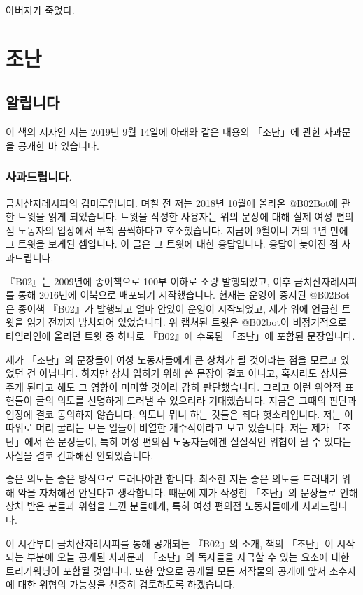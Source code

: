 \documentclass[a5paper,10pt, twoside, openright]{memoir}
\begin{document}
	아버지가 죽었다.



			\chapter{조난} 
				\section{알립니다} 
				이 책의 저자인 저는 2019년 9월 14일에 아래와 같은 내용의 「조난」에 관한 사과문을 공개한 바 있습니다.

				\subsection{사과드립니다.}
				금치산자레시피의 김미루입니다. 며칠 전 저는 2018년 10월에 올라온 @B02Bot에 관한 트윗을 읽게 되었습니다. 트윗을 작성한 사용자는 위의 문장에 대해 실제 여성 편의점 노동자의 입장에서 무척 끔찍하다고 호소했습니다. 지금이 9월이니 거의 1년 만에 그 트윗을 보게된 셈입니다. 이 글은 그 트윗에 대한 응답입니다. 응답이 늦어진 점 사과드립니다.

『B02』는 2009년에 종이책으로 100부 이하로 소량 발행되었고, 이후 금치산자레시피를 통해 2016년에 이북으로 배포되기 시작했습니다. 현재는 운영이 중지된 @B02Bot은 종이책 『B02』가 발행되고 얼마 안있어 운영이 시작되었고, 제가 위에 언급한 트윗을 읽기 전까지 방치되어 있었습니다. 위 캡쳐된 트윗은 @B02bot이 비정기적으로 타임라인에 올리던 트윗 중 하나로 『B02』에 수록된 「조난」에 포함된 문장입니다. 

제가 「조난」의 문장들이 여성 노동자들에게 큰 상처가 될 것이라는 점을 모르고 있었던 건 아닙니다. 하지만 상처 입히기 위해 쓴 문장이 결코 아니고, 혹시라도 상처를 주게 된다고 해도 그 영향이 미미할 것이라 감히 판단했습니다. 그리고 이런 위악적 표현들이 글의 의도를 선명하게 드러낼 수 있으리라 기대했습니다. 지금은 그때의 판단과 입장에 결코 동의하지 않습니다. 의도니 뭐니 하는 것들은 죄다 헛소리입니다. 저는 이따위로 머리 굴리는 모든 일들이 비열한 개수작이라고 보고 있습니다. 저는 제가 「조난」에서 쓴 문장들이, 특히 여성 편의점 노동자들에겐 실질적인 위협이 될 수 있다는 사실을 결코 간과해선 안되었습니다.

좋은 의도는 좋은 방식으로 드러나야만 합니다. 최소한 저는 좋은 의도를 드러내기 위해 악을 자처해선 안된다고 생각합니다. 때문에 제가 작성한 「조난」의 문장들로 인해 상처 받은 분들과 위협을 느낀 분들에게, 특히 여성 편의점 노동자들에게 사과드립니다.

이 시간부터 금치산자레시피를 통해 공개되는 『B02』의 소개, 책의 「조난」이 시작되는 부분에 오늘 공개된 사과문과 「조난」의 독자들을 자극할 수 있는 요소에 대한 트리거워닝이 포함될 것입니다. 또한 앞으로 공개될 모든 저작물의 공개에 앞서 소수자에 대한 위협의 가능성을 신중히 검토하도록 하겠습니다.
\end{document}
